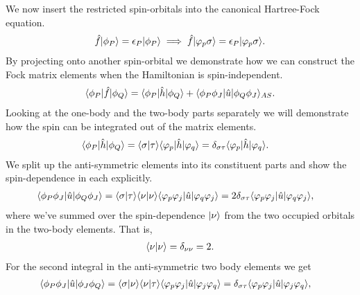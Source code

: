             We now insert the restricted spin-orbitals into the canonical
            Hartree-Fock equation.
            \begin{align}
                \hat{f}| \phi_P \rangle = \epsilon_P| \phi_P \rangle
                \implies
                \hat{f}| \varphi_p\sigma \rangle
                = \epsilon_P| \varphi_p\sigma \rangle.
            \end{align}
            By projecting onto another spin-orbital we demonstrate how we can
            construct the Fock matrix elements when the Hamiltonian is
            spin-independent.
            \begin{align}
                \langle \phi_P |\hat{f}| \phi_Q \rangle
                = \langle \phi_P |\hat{h}| \phi_Q \rangle
                + \langle \phi_P\phi_J |\hat{u}| \phi_Q\phi_J \rangle_{AS}.
            \end{align}
            Looking at the one-body and the two-body parts separately we will
            demonstrate how the spin can be integrated out of the matrix
            elements.
            \begin{align}
                \langle \phi_P |\hat{h}| \phi_Q \rangle
                &= \langle \sigma | \tau \rangle\langle \varphi_p |\hat{h}| \varphi_q \rangle
                = \delta_{\sigma\tau}\langle \varphi_p |\hat{h}| \varphi_q \rangle.
            \end{align}
            We split up the anti-symmetric elements into its constituent parts
            and show the spin-dependence in each explicitly.
            \begin{align}
                \langle \phi_P\phi_J |\hat{u}| \phi_Q\phi_J \rangle
                &= \langle \sigma | \tau \rangle\langle \nu | \nu \rangle
                \langle \varphi_p\varphi_j |\hat{u}| \varphi_q\varphi_j \rangle
                = 2 \delta_{\sigma\tau}
                \langle \varphi_p\varphi_j |\hat{u}| \varphi_q\varphi_j \rangle,
            \end{align}
            where we've summed over the spin-dependence $| \nu \rangle$ from the two
            occupied orbitals in the two-body elements.
            That is,
            \begin{align}
                \langle \nu | \nu \rangle = \delta_{\nu\nu} = 2.
            \end{align}
            For the second integral in the anti-symmetric two body elements we
            get
            \begin{align}
                \langle \phi_P\phi_J |\hat{u}| \phi_J\phi_Q \rangle
                &= \langle \sigma | \nu \rangle\langle \nu | \tau \rangle
                \langle \varphi_p\varphi_j |\hat{u}| \varphi_j\varphi_q \rangle
                = \delta_{\sigma\tau}
                \langle \varphi_p\varphi_j |\hat{u}| \varphi_j\varphi_q \rangle,
            \end{align}
